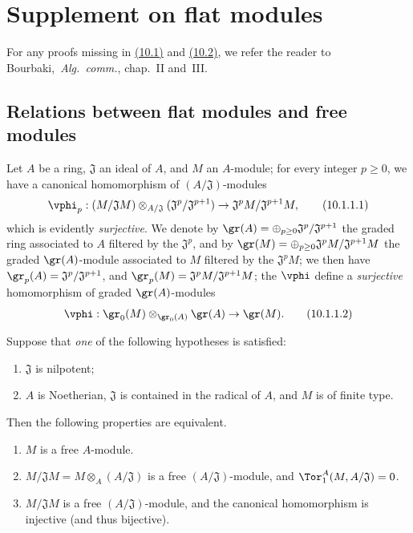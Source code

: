 \section{Supplement on flat modules}
\label{section:0.10}

For any proofs missing in \hyperref[subsection:0.10.1]{(10.1)} and \hyperref[subsection:0.10.2]{(10.2)}, we refer the reader to Bourbaki,~\emph{Alg.~comm.}, chap.~II and~III.

\subsection{Relations between flat modules and free modules}
\label{subsection:0.10.1}

\begin{env}[10.1.1]
\label{0.10.1.1}
Let $A$ be a ring, $\mathfrak{J}$ an ideal of $A$, and $M$ an $A$-module;
for every integer $p\geq0$, we have a canonical homomorphism of $(A/\mathfrak{J})$-modules
\[
\label{0.10.1.1.1}
  \vphi_p:(M/\mathfrak{J}M)\otimes_{A/\mathfrak{J}}(\mathfrak{J}^p/\mathfrak{J}^{p+1})\to\mathfrak{J}^pM/\mathfrak{J}^{p+1}M,
  \tag{10.1.1.1}
\]
which is evidently \emph{surjective}.
We denote by $\gr(A)=\oplus_{p\geq0}\mathfrak{J}^p/\mathfrak{J}^{p+1}$ the graded ring associated to $A$ filtered by the $\mathfrak{J}^p$, and by $\gr(M)=\oplus_{p\geq0}\mathfrak{J}^pM/\mathfrak{J}^{p+1}M$ the graded $\gr(A)$-module associated to $M$ filtered by the $\mathfrak{J}^pM$;
we then have $\gr_p(A)=\mathfrak{J}^p/\mathfrak{J}^{p+1}$, and $\gr_p(M)=\mathfrak{J}^pM/\mathfrak{J}^{p+1}M$;
the $\vphi$ define a \emph{surjective} homomorphism of graded $\gr(A)$-modules
\[
\label{0.10.1.1.2}
  \vphi:\gr_0(M)\otimes_{\gr_0(A)}\gr(A)\to\gr(M).
  \tag{10.1.1.2}
\]
\end{env}

\begin{env}[10.1.2]
\label{0.10.1.2}
Suppose that \emph{one} of the following hypotheses is satisfied:
\begin{enumerate}
  \item[(i)] $\mathfrak{J}$ is nilpotent;
  \item[(ii)] $A$ is Noetherian, $\mathfrak{J}$ is contained in the radical of $A$, and $M$ is of finite type.
\end{enumerate}
Then the following properties are equivalent.
\begin{enumerate}
  \item[(a)] $M$ is a free $A$-module.
  \item[(b)] $M/\mathfrak{J}M=M\otimes_A(A/\mathfrak{J})$ is a free $(A/\mathfrak{J})$-module, and $\Tor_1^A(M,A/\mathfrak{J})=0$.
  \item[(c)] $M/\mathfrak{J}M$ is a free $(A/\mathfrak{J})$-module, and the canonical homomorphism  is injective (and thus bijective).
\end{enumerate}
\end{env}

